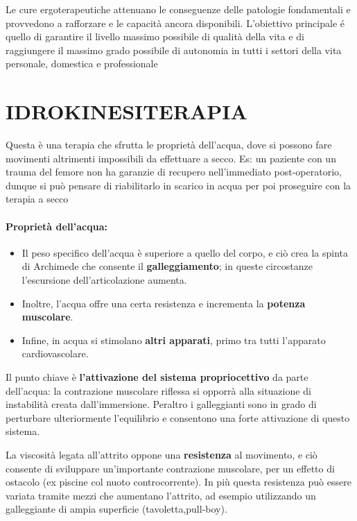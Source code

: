 Le cure ergoterapeutiche attenuano le conseguenze delle patologie
fondamentali e provvedono a rafforzare e le capacità ancora disponibili.
L'obiettivo principale é quello di garantire il livello massimo
possibile di qualità della vita e di raggiungere il massimo grado
possibile di autonomia in tutti i settori della vita personale,
domestica e professionale

\section{IDROKINESITERAPIA}
 

 

Questa è una terapia che sfrutta le proprietà dell'acqua, dove si
possono fare movimenti altrimenti impossibili da effettuare a secco. Es:
un paziente con un trauma del femore non ha garanzie di recupero
nell'immediato post-operatorio, dunque si può pensare di riabilitarlo in
scarico in acqua per poi proseguire con la terapia a secco

 
\paragraph{Proprietà dell'acqua:}

 

\begin{itemize}
\item
  Il peso specifico dell'acqua è superiore a quello del corpo, e ciò
  crea la spinta di Archimede che consente il \textbf{galleggiamento};
  in queste circostanze l'escursione dell'articolazione aumenta.
\item
  Inoltre, l'acqua offre una certa resistenza e incrementa la
  \textbf{potenza muscolare}.
\item
  Infine, in acqua si stimolano \textbf{altri apparati}, primo tra tutti
  l'apparato cardiovascolare.
\end{itemize}

Il punto chiave è \textbf{l'attivazione del sistema propriocettivo} da
parte dell'acqua: la contrazione muscolare riflessa si opporrà alla
situazione di instabilità creata dall'immersione. Peraltro i
galleggianti sono in grado di perturbare ulteriormente l'equilibrio e
consentono una forte attivazione di questo sistema.

La viscosità legata all'attrito oppone una \textbf{resistenza} al
movimento, e ciò consente di sviluppare un'importante contrazione
muscolare, per un effetto di ostacolo (ex piscine col nuoto
controcorrente). In più questa resistenza può essere variata tramite
mezzi che aumentano l'attrito, ad esempio utilizzando un galleggiante di
ampia superficie (tavoletta,pull-boy).

